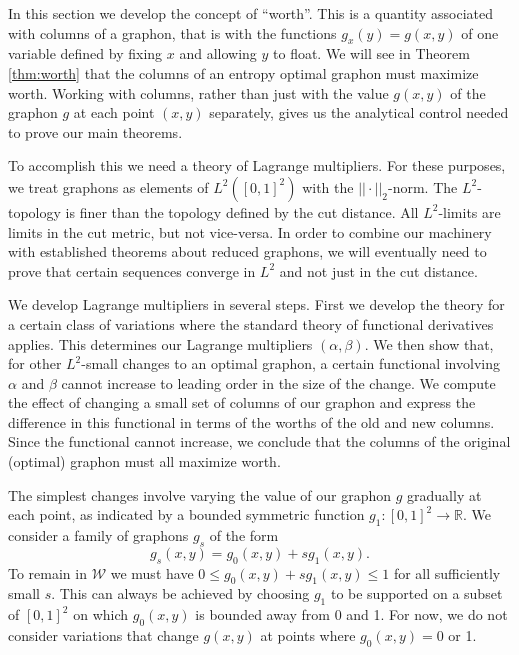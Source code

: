 \documentclass[12pt]{amsart}
\newcommand\be{\begin{equation}}
\newcommand\ee{\end{equation}}
\newcommand{\R}{\mathbb{R}}
\newcommand{\Value}{worth}
\newcommand{\Values}{worths}
\newcommand{\regular}{\mathcal{W}}
\begin{document}
{In this section we develop the concept of ``\Value''. This is a
quantity associated with columns of a graphon, that is with the functions 
$g_x(y) = g(x,y)$ of one variable defined by fixing $x$ and allowing $y$ to float. We will see 
in Theorem \ref{thm:worth} that the
columns of an entropy optimal graphon must maximize \Value. Working with
columns, rather than just with the value $g(x,y)$ of the graphon $g$ at
each point $(x,y)$ separately, gives us the analytical control needed to prove
our main theorems.

To accomplish this we need a theory of Lagrange
multipliers.
For these purposes, we treat graphons as elements of $L^2([0,1]^2)$ with the $||\cdot||_2$-norm. The $L^2$-topology is finer than 
the topology defined by the cut distance. All $L^2$-limits are limits in the cut metric, but not vice-versa.
In order to combine our machinery with established theorems about reduced graphons, we will eventually 
need to prove that certain sequences converge in $L^2$ and not just in the cut distance. 

We develop Lagrange multipliers in several steps. First we develop the theory for a 
certain class of variations where the standard theory of functional derivatives applies. This determines our
Lagrange multipliers $(\alpha, \beta)$. We then show that, for other $L^2$-small changes to an optimal graphon, a certain
functional involving $\alpha$ and $\beta$ cannot increase to leading order in the size of the change. We compute the
effect of changing a small set of columns of our graphon and express the difference in this functional in terms of the 
\Values{} of the old and new columns. Since the functional cannot increase, we conclude that the columns of the original
(optimal) graphon must all maximize \Value. 

The simplest changes involve varying the value of our graphon $g$ gradually at each point, as indicated
by a bounded symmetric function $g_1: [0,1]^2 \to \R$. We consider a family of graphons $g_s$ of the form 
\be g_s(x,y) = g_0(x,y) + s g_1(x,y). \label{eq:type-a} \ee
To remain in $\regular$ we must have $0 \le g_0(x,y) + s g_1(x,y) \le 1$ for all sufficiently small $s$.
This can always be achieved by choosing $g_1$ to be supported on a subset of 
$[0,1]^2$ on which $g_0(x,y)$ is bounded away from 0 and 1. For now, we do not consider variations that change 
$g(x,y)$ at points where $g_0(x,y)=0$ or 1. 

}
\end{document}
